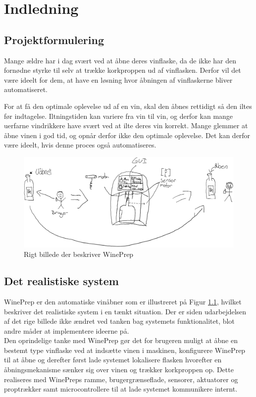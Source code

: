 \chapter{Indledning}
\section{Projektformulering}
Mange ældre har i dag svært ved at åbne deres vinflaske, da de ikke har den fornødne styrke til selv at trække korkproppen ud af vinflasken. Derfor vil det være ideelt for dem, at have en løsning hvor åbningen af vinflaskerne bliver automatiseret.

For at få den optimale oplevelse ud af en vin, skal den åbnes rettidigt så den iltes før indtagelse. Iltningstiden kan variere fra vin til vin, og derfor kan mange uerfarne vindrikkere have svært ved at ilte deres vin korrekt. Mange glemmer at åbne vinen i god tid, og opnår derfor ikke den optimale oplevelse. Det kan derfor være ideelt, hvis denne proces også automatiseres.

\begin{figure}[H]
	\includegraphics[scale=0.6]{WinePrep_realistisk.png}
	\caption{Rigt billede der beskriver WinePrep}
	\label{RIGTBILLEDE}
\end{figure}

\section{Det realistiske system}
WinePrep er den automatiske vinåbner som er illustreret på Figur \ref{RIGTBILLEDE}, hvilket beskriver det realistiske system i en tænkt situation. Der er siden udarbejdelsen af det rige billede ikke ændret ved tanken bag systemets funktionalitet, blot andre måder at implementere ideerne på.\\

Den oprindelige tanke med WinePrep gør det for brugeren muligt at åbne en bestemt type vinflaske ved at indsætte vinen i maskinen, konfigurere WinePrep til at åbne og derefter først lade systemet lokalisere flasken hvorefter en åbningsmekanisme sænker sig over vinen og trækker korkproppen op. Dette realiseres med WinePreps ramme, brugergrænseflade, sensorer, aktuatorer og proptrækker samt microcontrollere til at lade systemet kommunikere internt.

